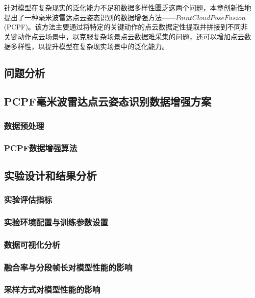 \chapter{}
针对模型在复杂现实的泛化能力不足和数据多样性匮乏这两个问题，本章创新性地提出了一种毫米波雷达点云姿态识别的数据增强方法——$PointCloud PoseFusion$(PCPF)。该方法主要通过将特定的关键动作的点云数据定性提取并拼接到不同非关键动作点云场景中，以克服复杂场景点云数据难采集的问题，还可以增加点云数据多样性，以提升模型在复杂现实场景中的泛化能力。


\section{问题分析}
\section{PCPF毫米波雷达点云姿态识别数据增强方案}

\subsection{数据预处理}
\subsection{PCPF数据增强算法}



\section{实验设计和结果分析}
\subsection{实验评估指标}
\subsection{实验环境配置与训练参数设置}
\subsection{数据可视化分析}
\subsection{融合率与分段帧长对模型性能的影响}
\subsection{采样方式对模型性能的影响}


